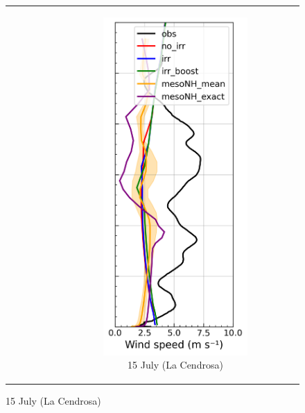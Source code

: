 \begin{figure}[hbtp]
{\begin{tabular}{@{}cccc@{}}
\begin{subfigure}[t]{0.289\textwidth}
        \end{subfigure} &
        \begin{subfigure}[t]{0.283\textwidth}
            \caption{15 July (La Cendrosa)}
            \includegraphics[width=\textwidth]{images/chap5/profiles/profile_cendrosa_wind_speed_1507_.png}

\end{subfigure}
\end{tabular}}
\end{figure}

